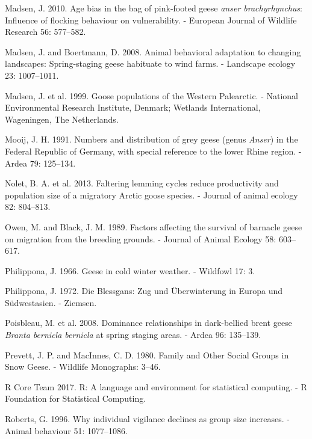 \documentclass[10pt,twocolumn]{paper}
\begin{document}
\hypertarget{ref-Madsen2010}{}
Madsen, J. 2010. Age bias in the bag of pink-footed geese \emph{anser
brachyrhynchus}: Influence of flocking behaviour on vulnerability. -
European Journal of Wildlife Research 56: 577--582.

\hypertarget{ref-madsen2008animal}{}
Madsen, J. and Boertmann, D. 2008. Animal behavioral adaptation to
changing landscapes: Spring-staging geese habituate to wind farms. -
Landscape ecology 23: 1007--1011.

\hypertarget{ref-madsen1999goose}{}
Madsen, J. et al. 1999. Goose populations of the Western Palearctic. -
National Environmental Research Institute, Denmark; Wetlands
International, Wageningen, The Netherlands.

\hypertarget{ref-mooij1991numbers}{}
Mooij, J. H. 1991. Numbers and distribution of grey geese (genus
\emph{Anser}) in the Federal Republic of Germany, with special reference
to the lower Rhine region. - Ardea 79: 125--134.

\hypertarget{ref-nolet2013faltering}{}
Nolet, B. A. et al. 2013. Faltering lemming cycles reduce productivity
and population size of a migratory Arctic goose species. - Journal of
animal ecology 82: 804--813.

\hypertarget{ref-owen1989survival}{}
Owen, M. and Black, J. M. 1989. Factors affecting the survival of
barnacle geese on migration from the breeding grounds. - Journal of
Animal Ecology 58: 603--617.

\hypertarget{ref-philippona1966geese}{}
Philippona, J. 1966. Geese in cold winter weather. - Wildfowl 17: 3.

\hypertarget{ref-philippona1972blessgans}{}
Philippona, J. 1972. Die Blessgans: Zug und Überwinterung in Europa und
Südwestasien. - Ziemsen.

\hypertarget{ref-poisbleau2008dominance}{}
Poisbleau, M. et al. 2008. Dominance relationships in dark-bellied brent
geese \emph{Branta bernicla bernicla} at spring staging areas. - Ardea
96: 135--139.

\hypertarget{ref-prevett1980snow}{}
Prevett, J. P. and MacInnes, C. D. 1980. Family and Other Social Groups
in Snow Geese. - Wildlife Monographs: 3--46.

\hypertarget{ref-R}{}
R Core Team 2017. R: A language and environment for statistical
computing. - R Foundation for Statistical Computing.

\hypertarget{ref-roberts1996individual}{}
Roberts, G. 1996. Why individual vigilance declines as group size
increases. - Animal behaviour 51: 1077--1086.
\end{document}
